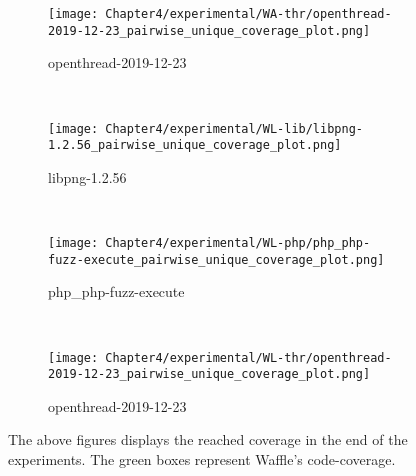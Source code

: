 \begin{figure}[!t]
\begin{adjustbox}{center,max width=1.3\textwidth}
\begin{subfigure}[t]{0.55\textwidth}
            \centering
            \texttt{[image: Chapter4/experimental/WA-thr/openthread-2019-12-23\_pairwise\_unique\_coverage\_plot.png]}
            \vspace*{-5mm}
            \label{wa:openthread:p}
            \caption{openthread-2019-12-23}
            \vspace*{5mm}
        \end{subfigure}
        ~
        \begin{subfigure}[t]{0.55\textwidth}
            \centering
            \texttt{[image: Chapter4/experimental/WL-lib/libpng-1.2.56\_pairwise\_unique\_coverage\_plot.png]}
            \vspace*{-5mm}
            \label{wl:lib:p}
            \caption{libpng-1.2.56}
            \vspace*{5mm}
        \end{subfigure}
    \end{adjustbox}
    ~
    \begin{adjustbox}{center,max width=1.3\textwidth}
        \begin{subfigure}[t]{0.55\textwidth}
            \centering
            \texttt{[image: Chapter4/experimental/WL-php/php\_php-fuzz-execute\_pairwise\_unique\_coverage\_plot.png]}
            \vspace*{-5mm}
            \label{wl:php:p}
            \caption{php\_php-fuzz-execute}
            \vspace*{5mm}
        \end{subfigure}
        ~
        \begin{subfigure}[t]{0.55\textwidth}
            \centering
            \texttt{[image: Chapter4/experimental/WL-thr/openthread-2019-12-23\_pairwise\_unique\_coverage\_plot.png]}
            \vspace*{-5mm}
            \label{wl:thr:p}
            \caption{openthread-2019-12-23}
            \vspace*{5mm}
        \end{subfigure}
    \end{adjustbox}
    \caption{The above figures displays the reached coverage in the end of the experiments. The green boxes represent Waffle's code-coverage.}
    \label{fig:report-unq}
\end{figure}

